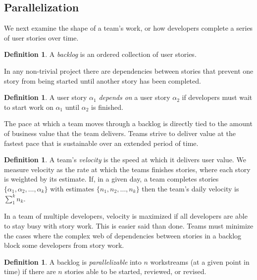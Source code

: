 \documentclass[letterpaper]{article}
\theoremstyle{definition}
\newtheorem{definition}[theorem]{Definition}
\begin{document}
    \subsection{Parallelization}\label{subsec:parallelization}

    We next examine the shape of a team's work, or how developers complete a series of user stories over time.

    \begin{definition}
        A \textit{backlog} is an ordered collection of user stories.
    \end{definition}

    In any non-trivial project there are dependencies between stories that prevent one story from being started until
    another story has been completed.

    \begin{definition}
        A user story $\alpha_1$ \textit{depends on} a user story $\alpha_2$ if developers must wait to start work on
        $\alpha_1$ until $\alpha_2$ is finished.
    \end{definition}

    The pace at which a team moves through a backlog is directly tied to the amount of business value that the team
    delivers.
    Teams strive to deliver value at the fastest pace that is sustainable over an extended period of time.

    \begin{definition}
        A team's \textit{velocity} is the speed at which it delivers user value.
        We measure velocity as the rate at which the teams finishes stories, where each story is weighted by its
        estimate.
        If, in a given day, a team completes stories $\{\alpha_1, \alpha_2,\dots,\alpha_k\}$ with estimates
        $\{n_1, n_2,\dots,n_k\}$ then the team's daily velocity is $\sum_1^k n_k$.
    \end{definition}

    In a team of multiple developers, velocity is maximized if all developers are able to stay busy with story work.
    This is easier said than done.
    Teams must minimize the cases where the complex web of dependencies between stories in a backlog block some
    developers from story work.

    \begin{definition}
        A backlog is \textit{parallelizable} into $n$ workstreams (at a given point in time) if there are $n$ stories
        able to be started, reviewed, or revised.
    \end{definition}
\end{document}

